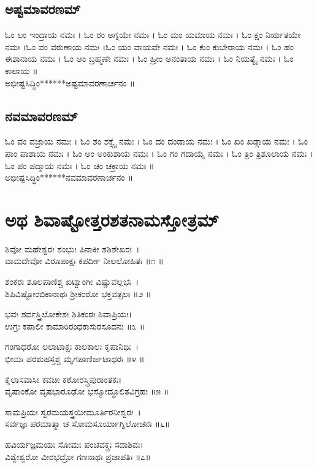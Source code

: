 \subsection{ಅಷ್ಟಮಾವರಣಮ್}
ಓಂ ಲಂ ಇಂದ್ರಾಯ ನಮಃ । ಓಂ ರಂ ಅಗ್ನಯೇ ನಮಃ । ಓಂ ಮಂ ಯಮಾಯ ನಮಃ । ಓಂ ಕ್ಷಂ ನಿರ್ಋತಯೇ ನಮಃ ।ಓಂ ವಂ ವರುಣಾಯ ನಮಃ ।ಓಂ ಯಂ ವಾಯವೇ ನಮಃ । ಓಂ ಕುಂ ಕುಬೇರಾಯ ನಮಃ । ಓಂ ಹಂ ಈಶಾನಾಯ ನಮಃ । ಓಂ ಆಂ ಬ್ರಹ್ಮಣೇ ನಮಃ । ಓಂ ಹ್ರೀಂ ಅನಂತಾಯ ನಮಃ । ಓಂ ನಿಯತ್ಯೈ ನಮಃ । ಓಂ ಕಾಲಾಯ ॥\\
ಅಭೀಷ್ಟಸಿದ್ಧಿಂ******ಅಷ್ಟಮಾವರಣಾರ್ಚನಂ ॥
\subsection{ನವಮಾವರಣಮ್}
ಓಂ ವಂ ವಜ್ರಾಯ ನಮಃ । ಓಂ ಶಂ ಶಕ್ತ್ಯೈ ನಮಃ । ಓಂ ದಂ ದಂಡಾಯ ನಮಃ । ಓಂ ಖಂ ಖಡ್ಗಾಯ ನಮಃ । ಓಂ ಪಾಂ ಪಾಶಾಯ ನಮಃ । ಓಂ ಅಂ ಅಂಕುಶಾಯ ನಮಃ । ಓಂ ಗಂ ಗದಾಯೈ ನಮಃ । ಓಂ  ತ್ರಿಂ  ತ್ರಿಶೂಲಾಯ ನಮಃ । ಓಂ ಪಂ ಪದ್ಮಾಯ ನಮಃ । ಓಂ ಚಂ ಚಕ್ರಾಯ ನಮಃ ॥\\
ಅಭೀಷ್ಟಸಿದ್ಧಿಂ******ನವಮಾವರಣಾರ್ಚನಂ ॥
\newpage
\section{ಅಥ ಶಿವಾಷ್ಟೋತ್ತರಶತನಾಮಸ್ತೋತ್ರಮ್ }

ಶಿವೋ ಮಹೇಶ್ವರಃ ಶಂಭುಃ ಪಿನಾಕೀ ಶಶಿಶೇಖರಃ~।\\
ವಾಮದೇವೋ ವಿರೂಪಾಕ್ಷಃ ಕಪರ್ದೀ ನೀಲಲೋಹಿತಃ ॥೧ ॥

ಶಂಕರಃ ಶೂಲಪಾಣಿಶ್ಚ ಖಟ್ವಾಂಗೀ ವಿಷ್ಣುವಲ್ಲಭಃ~।\\
ಶಿಪಿವಿಷ್ಟೋಂಬಿಕಾನಾಥಃ ಶ್ರೀಕಂಠೋ ಭಕ್ತವತ್ಸಲಃ ॥೨ ॥

ಭವಃ ಶರ್ವಸ್ತ್ರಿಲೋಕೇಶಃ ಶಿತಿಕಂಠಃ ಶಿವಾಪ್ರಿಯಃ।\\
ಉಗ್ರಃ ಕಪಾಲೀ ಕಾಮಾರಿರಂಧಕಾಸುರಸೂದನಃ ॥೩ ॥

ಗಂಗಾಧರೋ ಲಲಾಟಾಕ್ಷಃ ಕಾಲಕಾಲಃ ಕೃಪಾನಿಧಿಃ~।\\
ಭೀಮಃ ಪರಶುಹಸ್ತಶ್ಚ ಮೃಗಪಾಣಿರ್ಜಟಾಧರಃ ॥೪ ॥

ಕೈಲಾಸವಾಸೀ ಕವಚೀ ಕಠೋರಸ್ತ್ರಿಪುರಾಂತಕಃ।\\
ವೃಷಾಂಕೋ ವೃಷಭಾರೂಢೋ ಭಸ್ಮೋದ್ಧೂಲಿತವಿಗ್ರಹಃ ॥೫ ॥

ಸಾಮಪ್ರಿಯಃ ಸ್ವರಮಯಸ್ತ್ರಯೀಮೂರ್ತಿರನೀಶ್ವರಃ~।\\
ಸರ್ವಜ್ಞಃ ಪರಮಾತ್ಮಾ ಚ ಸೋಮಸೂರ್ಯಾಗ್ನಿಲೋಚನಃ ॥೬॥

ಹವಿರ್ಯಜ್ಞಮಯಃ ಸೋಮಃ ಪಂಚವಕ್ತ್ರಃ ಸದಾಶಿವಃ।\\
ವಿಶ್ವೇಶ್ವರೋ ವೀರಭದ್ರೋ ಗಣನಾಥಃ ಪ್ರಜಾಪತಿಃ ॥೭॥


